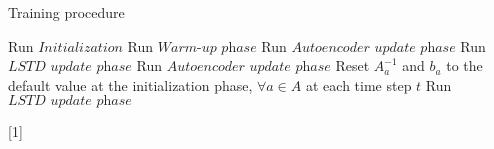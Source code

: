 \documentclass[a4paper,12pt,oneside]{article}
\numberwithin{equation}{section}
\begin{document}
    \clearpage
    \begin{algorithm}
        \caption{Training procedure}
        \begin{algorithmic}[1]
        \State Run \(Initialization\)
            \State Run \(\textit{Warm-up phase}\)
            \State Run \(\textit{Autoencoder update phase}\)
            \State Run \(\textit{LSTD update phase}\)
            \State Run \(\textit{Autoencoder update phase}\)
                \State Reset \(A_a^{-1}\) and \(b_a\) to the default value at the initialization phase, $\forall a \in A$ at each time step $t$
            \EndIf
            \State Run \(\textit{LSTD update phase}\)
        \EndWhile
        \end{algorithmic}[1]    
    \end{algorithm}
    
    
\end{document}
